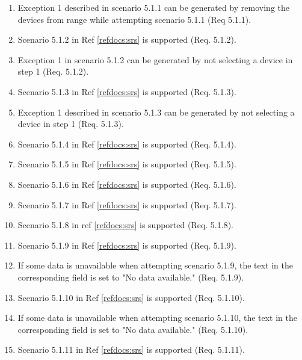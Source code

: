 \documentclass[a4paper]{article}
\newlength{\testlabellength}
\newenvironment{testlist}{\begin{enumerate}[label=\bfseries Instruction \thesubsection.\arabic* , labelindent=0pt, labelwidth=\testlabellength , leftmargin=2cm]}{\end{enumerate}}
\begin{document}
\begin{appendices}
\begin{testlist}
	\item Exception 1 described in scenario 5.1.1 can be generated by removing the devices from range while attempting scenario 5.1.1 (Req 5.1.1).
	
	\item Scenario 5.1.2 in Ref \ref{refdocs:srs} is supported (Req. 5.1.2).
	
	\item Exception 1 in scenario 5.1.2 can be generated by not selecting a device in step 1 (Req. 5.1.2).
	
	\item Scenario 5.1.3 in Ref \ref{refdocs:srs} is supported (Req. 5.1.3).
	
	\item Exception 1 described in scenario 5.1.3 can be generated by not selecting a device in step 1 (Req. 5.1.3). 
	
	\item Scenario 5.1.4 in Ref \ref{refdocs:srs} is supported (Req. 5.1.4).
	
	\item Scenario 5.1.5 in Ref \ref{refdocs:srs} is supported (Req. 5.1.5).
	
	\item Scenario 5.1.6 in Ref \ref{refdocs:srs} is supported (Req. 5.1.6).
	
	\item Scenario 5.1.7 in Ref \ref{refdocs:srs} is supported (Req. 5.1.7).
	
	\item Scenario 5.1.8 in ref \ref{refdocs:srs} is supported (Req. 5.1.8).

	\item Scenario 5.1.9 in Ref \ref{refdocs:srs} is supported (Req. 5.1.9).
	
	\item If some data is unavailable when attempting scenario 5.1.9, the text in the corresponding field is set to "No data available." (Req. 5.1.9).
	
	\item Scenario 5.1.10 in Ref \ref{refdocs:srs} is supported (Req. 5.1.10).
	
	\item If some data is unavailable when attempting scenario 5.1.10, the text in the corresponding field is set to "No data available." (Req. 5.1.10).
	
	\item Scenario 5.1.11 in Ref \ref{refdocs:srs} is supported (Req. 5.1.11).
	

\end{testlist}
\end{appendices}
\end{document}
